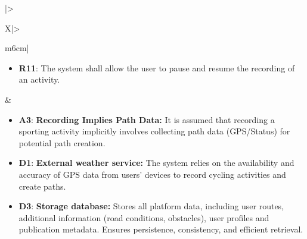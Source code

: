 \begin{table}[H]
\begin{tabularx}{\textwidth}{|>{\raggedright\arraybackslash}X|>{\raggedright\arraybackslash}m{6cm}|}
\begin{minipage}[t]{\linewidth}
\begin{itemize}[leftmargin=*, nosep, label={}]
            \item \textbf{R11}: The system shall allow the user to pause and resume the recording of an activity.
        \end{itemize}
        \end{minipage}
        &
        \begin{minipage}[t]{\linewidth}
        \begin{itemize}[leftmargin=*, nosep, label={}]
            \item \textbf{A3}: \textbf{Recording Implies Path Data:} It is assumed that recording a sporting activity implicitly involves collecting path data (GPS/Status) for potential path creation.
            \item \textbf{D1}: \textbf{External weather service:} The system relies on the availability and accuracy of GPS data from users’ devices to record cycling activities and create paths.
            \item \textbf{D3}: \textbf{Storage database:} Stores all platform data, including user routes, additional information (road conditions, obstacles), user profiles and publication metadata. Ensures persistence, consistency, and efficient retrieval.
        \end{itemize}
        \end{minipage}
        \\ \hline
    \end{tabularx}
    \caption{Requirement Mapping for G1}
    \label{tab:mapping_g1}
\end{table}

